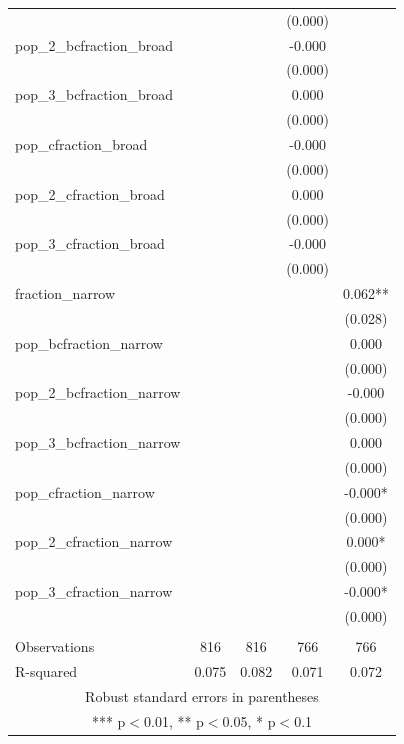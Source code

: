 \documentclass[]{article}
\begin{document}
\begin{tabular}{lcccc}
 &  &  & (0.000) &  \\
pop\_2\_bcfraction\_broad &  &  & -0.000 &  \\
 &  &  & (0.000) &  \\
pop\_3\_bcfraction\_broad &  &  & 0.000 &  \\
 &  &  & (0.000) &  \\
pop\_cfraction\_broad &  &  & -0.000 &  \\
 &  &  & (0.000) &  \\
pop\_2\_cfraction\_broad &  &  & 0.000 &  \\
 &  &  & (0.000) &  \\
pop\_3\_cfraction\_broad &  &  & -0.000 &  \\
 &  &  & (0.000) &  \\
fraction\_narrow &  &  &  & 0.062** \\
 &  &  &  & (0.028) \\
pop\_bcfraction\_narrow &  &  &  & 0.000 \\
 &  &  &  & (0.000) \\
pop\_2\_bcfraction\_narrow &  &  &  & -0.000 \\
 &  &  &  & (0.000) \\
pop\_3\_bcfraction\_narrow &  &  &  & 0.000 \\
 &  &  &  & (0.000) \\
pop\_cfraction\_narrow &  &  &  & -0.000* \\
 &  &  &  & (0.000) \\
pop\_2\_cfraction\_narrow &  &  &  & 0.000* \\
 &  &  &  & (0.000) \\
pop\_3\_cfraction\_narrow &  &  &  & -0.000* \\
 &  &  &  & (0.000) \\
 &  &  &  &  \\
Observations & 816 & 816 & 766 & 766 \\
 R-squared & 0.075 & 0.082 & 0.071 & 0.072 \\ \hline
\multicolumn{5}{c}{ Robust standard errors in parentheses} \\
\multicolumn{5}{c}{ *** p$<$0.01, ** p$<$0.05, * p$<$0.1} \\
\end{tabular}
\end{document}
